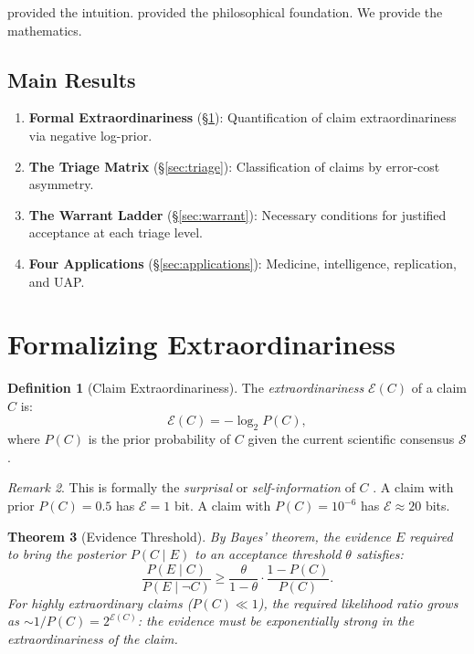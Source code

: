 \documentclass[12pt, a4paper]{article}
\theoremstyle{plain}
\newtheorem{theorem}{Theorem}[section]
\theoremstyle{definition}
\newtheorem{definition}[theorem]{Definition}
\theoremstyle{remark}
\newtheorem{remark}[theorem]{Remark}
\begin{document}
\citet{Sagan1979} provided the intuition. \citet{Hume1748} provided the
philosophical foundation. We provide the mathematics.

\subsection{Main Results}
\begin{enumerate}
  \item \textbf{Formal Extraordinariness} (\S\ref{sec:formal}):
    Quantification of claim extraordinariness via negative log-prior.
  \item \textbf{The Triage Matrix} (\S\ref{sec:triage}): Classification
    of claims by error-cost asymmetry.
  \item \textbf{The Warrant Ladder} (\S\ref{sec:warrant}): Necessary
    conditions for justified acceptance at each triage level.
  \item \textbf{Four Applications} (\S\ref{sec:applications}):
    Medicine, intelligence, replication, and UAP.
\end{enumerate}

\section{Formalizing Extraordinariness}\label{sec:formal}

\begin{definition}[Claim Extraordinariness]\label{def:extraordinary}
  The \emph{extraordinariness} $\mathcal{E}(C)$ of a claim $C$ is:
  \begin{equation}
    \mathcal{E}(C) = -\log_2 P(C),
  \end{equation}
  where $P(C)$ is the prior probability of $C$ given the current
  scientific consensus $\mathcal{S}$.
\end{definition}

\begin{remark}
  This is formally the \emph{surprisal} or \emph{self-information}
  of $C$ \citep{Shannon1948}. A claim with prior $P(C) = 0.5$ has
  $\mathcal{E} = 1$ bit. A claim with $P(C) = 10^{-6}$ has
  $\mathcal{E} \approx 20$ bits.
\end{remark}

\begin{theorem}[Evidence Threshold]\label{thm:threshold}
  By Bayes' theorem, the evidence $E$ required to bring the posterior
  $P(C \mid E)$ to an acceptance threshold $\theta$ satisfies:
  \begin{equation}\label{eq:threshold}
    \frac{P(E \mid C)}{P(E \mid \neg C)} \geq
    \frac{\theta}{1 - \theta} \cdot \frac{1 - P(C)}{P(C)}.
  \end{equation}
  For highly extraordinary claims ($P(C) \ll 1$), the required
  likelihood ratio grows as $\sim 1/P(C) = 2^{\mathcal{E}(C)}$:
  the evidence must be \emph{exponentially} strong in the
  extraordinariness of the claim.
\end{theorem}
\end{document}
